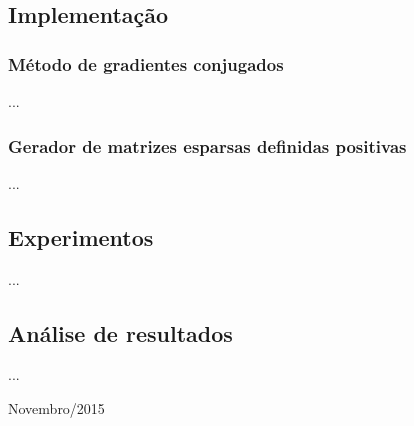 \documentclass[a4paper,11pt]{article}
\begin{document}
\subsection{Implementação}
\subsubsection{Método de gradientes conjugados}
...
\subsubsection{Gerador de matrizes esparsas definidas positivas}
...
\subsection{Experimentos}
...
\subsection{Análise de resultados}
...

\vfill

\raggedleft
    {\sc Novembro/2015}
    
\end{document}
